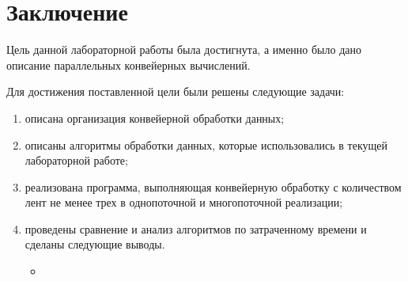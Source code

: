 \chapter*{Заключение}
Цель данной лабораторной работы была достигнута, а именно было дано описание параллельных конвейерных вычислений.

Для достижения поставленной цели были решены следующие задачи:
\begin{enumerate}
	\item описана организация конвейерной обработки данных;
	\item описаны алгоритмы обработки данных, которые использовались в текущей лабораторной работе;
	\item реализована программа, выполняющая конвейерную обработку с количеством лент не менее трех в однопоточной и многопоточной реализации;
	\item проведены сравнение и анализ алгоритмов по затраченному времени и сделаны следующие выводы.
	\begin{itemize}
		\item
	\end{itemize}
\end{enumerate}
